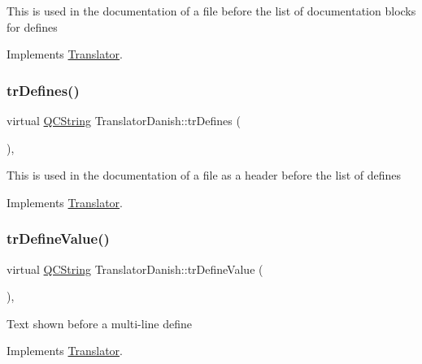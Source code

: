 This is used in the documentation of a file before the list of documentation blocks for defines 

Implements \mbox{\hyperlink{class_translator}{Translator}}.

\mbox{\label{class_translator_danish_a82265b14a899a448ad98bdce4d916202}} 
\subsubsection{\texorpdfstring{trDefines()}{trDefines()}}
{\footnotesize\ttfamily virtual \mbox{\hyperlink{class_q_c_string}{Q\+C\+String}} Translator\+Danish\+::tr\+Defines (\begin{DoxyParamCaption}{ }\end{DoxyParamCaption})\hspace{0.3cm}{\ttfamily [inline]}, {\ttfamily [virtual]}}

This is used in the documentation of a file as a header before the list of defines 

Implements \mbox{\hyperlink{class_translator}{Translator}}.

\mbox{\label{class_translator_danish_a5c1808e13d44b5bae8dd1d7102b87a5e}} 
\subsubsection{\texorpdfstring{trDefineValue()}{trDefineValue()}}
{\footnotesize\ttfamily virtual \mbox{\hyperlink{class_q_c_string}{Q\+C\+String}} Translator\+Danish\+::tr\+Define\+Value (\begin{DoxyParamCaption}{ }\end{DoxyParamCaption})\hspace{0.3cm}{\ttfamily [inline]}, {\ttfamily [virtual]}}

Text shown before a multi-\/line define 

Implements \mbox{\hyperlink{class_translator}{Translator}}.

\mbox{\label{class_translator_danish_ad1086a15d4d98a840d221df9422d7f12}} 
